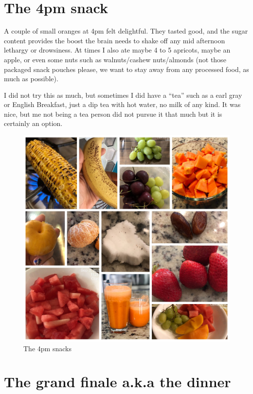 \documentclass[
  oneside]{book}
\begin{document}
\hypertarget{the-4pm-snack}{%
\section{The 4pm snack}\label{the-4pm-snack}}

A couple of small oranges at 4pm felt delightful. They tasted good, and the sugar content provides the boost the brain needs to shake off any mid afternoon lethargy or drowsiness. At times I also ate maybe 4 to 5 apricots, maybe an apple, or even some nuts such as walnuts/cashew nuts/almonds (not those packaged snack pouches please, we want to stay away from any processed food, as much as possible).

I did not try this as much, but sometimes I did have a ``tea'' such as a earl gray or English Breakfast, just a dip tea with hot water, no milk of any kind. It was nice, but me not being a tea person did not pursue it that much but it is certainly an option.

\begin{figure}
\centering
\includegraphics{pictures/4pm-snacks.JPG}
\caption{The 4pm snacks}
\end{figure}

\pagebreak

\hypertarget{the-grand-finale-a.k.a-the-dinner}{%
\section{The grand finale a.k.a the dinner}\label{the-grand-finale-a.k.a-the-dinner}}
\end{document}
